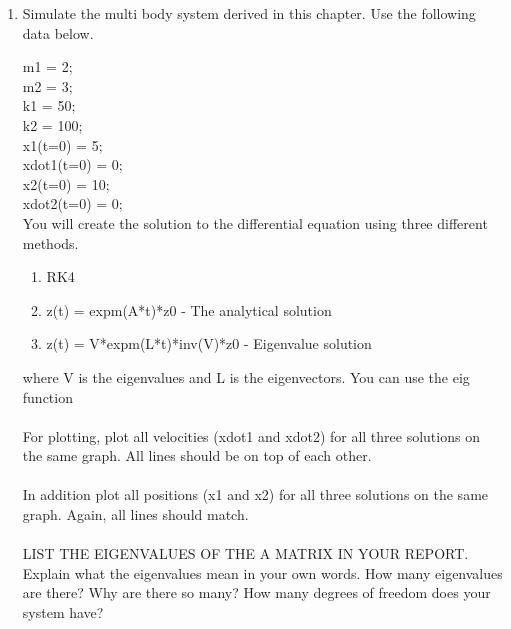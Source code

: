 \begin{enumerate}
\item Simulate the multi body system derived in this chapter. Use the
  following data below.

  m1 = 2;\\
  m2 = 3;\\
  k1 = 50;\\
  k2 = 100;\\
  x1(t=0) = 5;\\
  xdot1(t=0) = 0;\\
  x2(t=0) = 10;\\
  xdot2(t=0) = 0;\\
  
  You will create the solution to the differential equation using three
  different methods. 

  \begin{enumerate}

    \item RK4

    \item z(t) = expm(A*t)*z0 - The analytical solution

    \item z(t) = V*expm(L*t)*inv(V)*z0 - Eigenvalue solution

  \end{enumerate}

  where V is the eigenvalues and L is the eigenvectors. You can use
  the eig function \\
  \ \\
  For plotting, plot all velocities (xdot1 and xdot2) for all three
  solutions on the same graph. All lines should be on top of each
  other.  \\
  \ \\
  In addition plot all positions (x1 and x2) for all three solutions
  on the same graph. Again, all lines should match. \\
  \ \\
  LIST THE EIGENVALUES OF THE A MATRIX IN YOUR REPORT. Explain what
  the eigenvalues mean in your own words. How many eigenvalues are
  there? Why are there so many? How many degrees of freedom does your
  system have? 

\end{enumerate}
